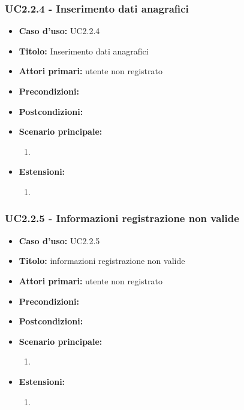 \documentclass[casi-duso]{subfiles}
\begin{document}
\subsubsection{UC2.2.4 - Inserimento dati anagrafici}
\label{subsub:uc2.2.4utente}
\begin{itemize}
  \item \textbf{Caso d’uso:} UC2.2.4 
  \item \textbf{Titolo:} Inserimento dati anagrafici
  \item \textbf{Attori primari:} utente non registrato
  \item \textbf{Precondizioni:} 
  \item \textbf{Postcondizioni:}  
  \item \textbf{Scenario principale:} 
  \begin{enumerate}
    \item 
  \end{enumerate}
  \item \textbf{Estensioni:} 
  \begin{enumerate}
    \item 
  \end{enumerate}     
\end{itemize}

\subsubsection{UC2.2.5 - Informazioni registrazione non valide}
\label{subsub:uc2.2.5utente}
\begin{itemize}
  \item \textbf{Caso d’uso:} UC2.2.5 
  \item \textbf{Titolo:} informazioni registrazione non valide
  \item \textbf{Attori primari:} utente non registrato
  \item \textbf{Precondizioni:} 
  \item \textbf{Postcondizioni:}  
  \item \textbf{Scenario principale:} 
  \begin{enumerate}
    \item 
  \end{enumerate}
  \item \textbf{Estensioni:} 
  \begin{enumerate}
    \item 
  \end{enumerate}     
\end{itemize}
\end{document}
